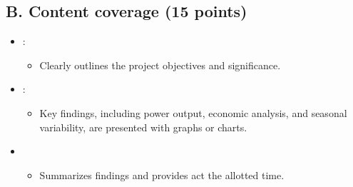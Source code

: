 \documentclass[letterpaper,10pt,english]{jupyterBook}
\begin{document}
\subsection{B. Content coverage (15 points)}
\label{\detokenize{ProjectSyllabus:id10}}\begin{itemize}
\item {} 
\sphinxAtStartPar
{}:
\begin{itemize}
\item {} 
\sphinxAtStartPar
Clearly outlines the project objectives and significance.

\end{itemize}

\item {} 
\sphinxAtStartPar
{}:
\begin{itemize}
\item {} 
\sphinxAtStartPar
Key findings, including power output, economic analysis, and
seasonal variability, are presented with graphs or charts.

\end{itemize}

\item {} \begin{itemize}
\item {} 
\sphinxAtStartPar
Summarizes findings and provides act the allotted time.

\end{itemize}

\end{itemize}
\end{document}
